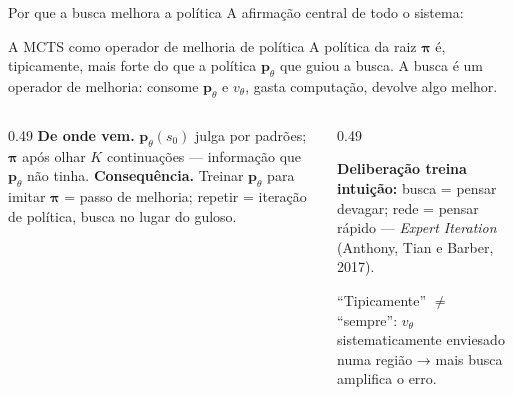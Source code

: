 \documentclass[aspectratio=169, 10pt]{beamer}
\newcommand{\redeval}{v_{\theta}}
\newcommand{\redepol}{\bm{p}_{\theta}}
\newcommand{\raizpol}{\bm{\pi}}
\begin{document}
\begin{frame}{Por que a busca melhora a política}
  \footnotesize
  A afirmação central de todo o sistema:

  \begin{teobox}{A MCTS como operador de melhoria de política}
    A política da raiz $\raizpol$ é, tipicamente, mais forte do que a política
    $\redepol$ que guiou a busca. A busca é um \alert{operador de melhoria}:
    consome $\redepol$ e $\redeval$, gasta computação, devolve algo melhor.
  \end{teobox}

  \begin{columns}[T]
    \begin{column}{0.49\textwidth}
      \textbf{De onde vem.} $\redepol(s_0)$ julga por padrões; $\raizpol$ após olhar $K$ continuações — informação que $\redepol$ não tinha.
      \smallskip
      \textbf{Consequência.} Treinar $\redepol$ para imitar $\raizpol$ = passo de melhoria; repetir = iteração de política, busca no lugar do guloso.
    \end{column}
    \begin{column}{0.49\textwidth}
      \begin{ideiabox}
        \textbf{Deliberação treina intuição:} busca = pensar devagar; rede = pensar rápido — \emph{Expert Iteration} (Anthony, Tian e Barber, 2017).
      \end{ideiabox}
      \begin{alertabox}
        ``Tipicamente'' $\neq$ ``sempre'': $\redeval$ sistematicamente enviesado numa região → mais busca amplifica o erro.
      \end{alertabox}
    \end{column}
  \end{columns}
\end{frame}
\end{document}
